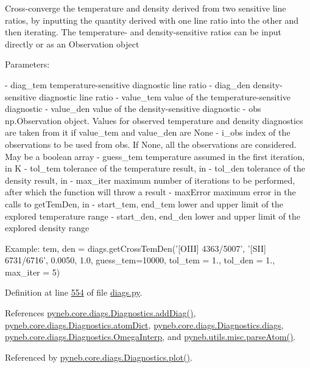 \begin{DoxyVerb}Cross-converge the temperature and density derived from two sensitive line ratios, by inputting the quantity 
derived with one line ratio into the other and then iterating.
The temperature- and density-sensitive ratios can be input directly or as an Observation object
    
Parameters:
    
- diag_tem   temperature-sensitive diagnostic line ratio
- diag_den   density-sensitive diagnostic line ratio
- value_tem  value of the temperature-sensitive diagnostic
- value_den  value of the density-sensitive diagnostic
- obs        np.Observation object. Values for observed temperature and density diagnostics are
        taken from it if value_tem and value_den are None
- i_obs      index of the observations to be used from obs. 
        If None, all the observations are considered.
        May be a boolean array
- guess_tem  temperature assumed in the first iteration, in K
- tol_tem    tolerance of the temperature result, in %
- tol_den    tolerance of the density result, in %
- max_iter   maximum number of iterations to be performed, after which the function will throw a result
- maxError   maximum error in the calls to getTemDen, in %
- start_tem, end_tem  lower and upper limit of the explored temperature range 
- start_den, end_den  lower and upper limit of the explored density range 
    
Example:
    tem, den = diags.getCrossTemDen('[OIII] 4363/5007', '[SII] 6731/6716', 0.0050, 1.0, 
        guess_tem=10000, tol_tem = 1., tol_den = 1., max_iter = 5)\end{DoxyVerb}
 

Definition at line \hyperlink{diags_8py_source_l00554}{554} of file \hyperlink{diags_8py_source}{diags.\+py}.



References \hyperlink{diags_8py_source_l00246}{pyneb.\+core.\+diags.\+Diagnostics.\+add\+Diag()}, \hyperlink{diags_8py_source_l00407}{pyneb.\+core.\+diags.\+Diagnostics.\+atom\+Dict}, \hyperlink{diags_8py_source_l00173}{pyneb.\+core.\+diags.\+Diagnostics.\+diags}, \hyperlink{diags_8py_source_l00000}{pyneb.\+core.\+diags.\+Diagnostics.\+Omega\+Interp}, and \hyperlink{misc_8py_source_l00117}{pyneb.\+utils.\+misc.\+parse\+Atom()}.



Referenced by \hyperlink{diags_8py_source_l00421}{pyneb.\+core.\+diags.\+Diagnostics.\+plot()}.


